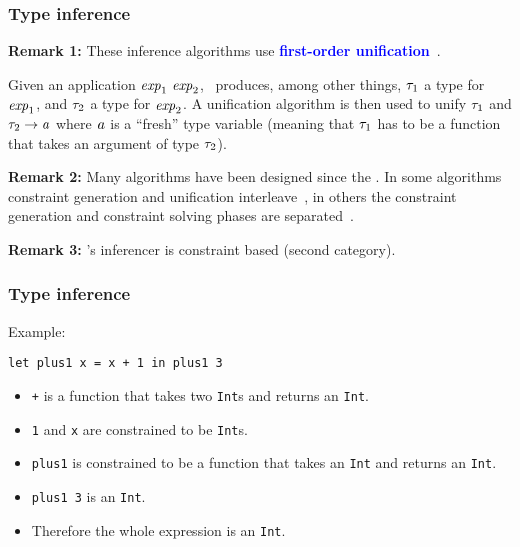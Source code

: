 \documentclass[12pt,red]{beamer}
\newcommand{\cemph}[1]{\textcolor{blue}{\textbf{#1}}}
\begin{document}
\begin{frame}
  \frametitle{Type inference}

  \textbf{Remark 1:} These inference algorithms use \cemph{first-order
    unification}~\cite{Martelli+Montanari:1982,Baader+Nipkow:1998}.

  \vspace{0.05in}

  Given an application $\mathit{exp}_1\ \mathit{exp}_2$,
  \WALGO\ produces, among other things, $\mathit{\tau}_1$ a type for
  $\mathit{exp}_1$, and $\mathit{\tau}_2$ a type for $\mathit{exp}_2$.
  A unification algorithm is then used to unify $\mathit{\tau}_1$ and
  $\mathit{\tau}_2\rightarrow\mathit{a}$ where $\mathit{a}$ is a
  ``fresh'' type variable (meaning that $\mathit{\tau}_1$ has to be a
  function that takes an argument of type $\mathit{\tau}_2$).

  \vspace{0.1in}

  \textbf{Remark 2:} Many algorithms have been designed since the \WALGO.  In
  some algorithms constraint generation and unification
  interleave~\cite{Milner:1978,Damas+Milner:1982,Lee+Yi:1998,McAdam:1999,Yang:2000},
  in others the constraint generation and constraint solving phases
  are
  separated~\cite{Odersky+Sulzmann+Wehr:1999,Pottier:2005,Pottier+Remy:2005}.

  \vspace{0.1in}

  \textbf{Remark 3:} \EML's inferencer is constraint based (second category).
\end{frame}


\begin{frame}
  \frametitle{Type inference}

  Example:
  \begin{beamerboxesrounded}[shadow=true]{}
    \begin{center}
      \lstinline{let plus1 x = x + 1 in plus1 3}
    \end{center}
  \end{beamerboxesrounded}

  \begin{itemize}
  \item \lstinline{+} is a function that takes two \lstinline{Int}s
    and returns an \lstinline{Int}.

  \item \lstinline{1} and \lstinline{x} are constrained to be
    \lstinline{Int}s.

  \item \lstinline{plus1} is constrained to be a function that takes
    an \lstinline{Int} and returns an \lstinline{Int}.

  \item \lstinline{plus1 3} is an \lstinline{Int}.

  \item Therefore the whole expression is an \lstinline{Int}.
  \end{itemize}
\end{frame}
\end{document}
